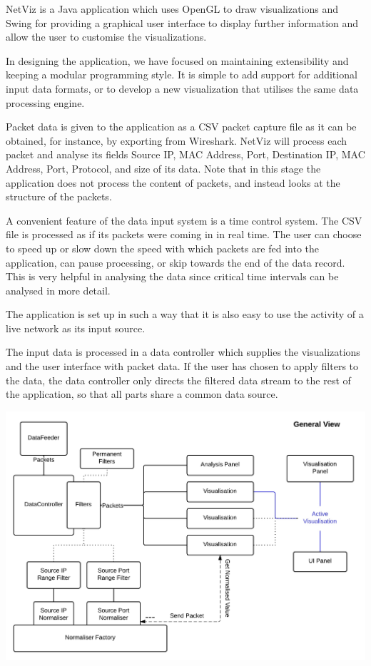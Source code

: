 NetViz is a Java application which uses OpenGL to draw visualizations and Swing for providing a graphical user interface to display further information and allow the user to customise the visualizations.

In designing the application, we have focused on maintaining extensibility and keeping a modular programming style. It is simple to add support for additional input data formats, or to develop a new visualization that utilises the same data processing engine.

Packet data is given to the application as a CSV packet capture file as it can be obtained, for instance, by exporting from Wireshark. NetViz will process each packet and analyse its fields Source IP, MAC Address, Port, Destination IP, MAC Address, Port, Protocol, and size of its data. Note that in this stage the application does not process the content of packets, and instead looks at the structure of the packets.

A convenient feature of the data input system is a time control system. The CSV file is processed as if its packets were coming in in real time. The user can choose to speed up or slow down the speed with which packets are fed into the application, can pause processing, or skip towards the end of the data record. This is very helpful in analysing the data since critical time intervals can be analysed in more detail.

The application is set up in such a way that it is also easy to use the activity of a live network as its input source.

The input data is processed in a data controller which supplies the visualizations and the user interface with packet data. If the user has chosen to apply filters to the data, the data controller only directs the filtered data stream to the rest of the application, so that all parts share a common data source.

\includegraphics[width=\linewidth]{materials/architecture.jpg}

